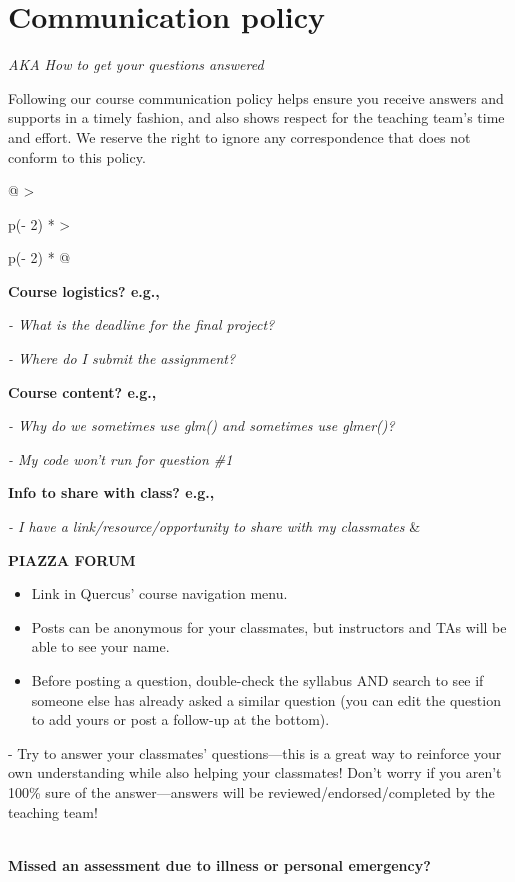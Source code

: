 \documentclass[
  openany]{book}
\begin{document}
\hypertarget{communication-policy}{%
\section{Communication policy}\label{communication-policy}}

\emph{AKA How to get your questions answered}

Following our course communication policy helps ensure you receive answers and supports in a timely fashion, and also shows respect for the teaching team's time and effort. We reserve the right to ignore any correspondence that does not conform to this policy.

\begin{longtable}[]{@{}
  >{\raggedright\arraybackslash}p{(\columnwidth - 2\tabcolsep) * }
  >{\raggedright\arraybackslash}p{(\columnwidth - 2\tabcolsep) * }@{}}
\toprule
\endhead
\textbf{Course logistics? e.g.,}

\emph{- What is the deadline for the final project?}

\emph{- Where do I submit the assignment?}

\textbf{Course content? e.g.,}

\emph{- Why do we sometimes use glm() and sometimes use glmer()?}

\emph{- My code won't run for question \#1}

\textbf{Info to share with class? e.g.,}

\emph{- I have a link/resource/opportunity to share with my classmates} & \begin{minipage}[t]{\linewidth}\raggedright
\textbf{PIAZZA FORUM}

\begin{itemize}
\item
  Link in Quercus' course navigation menu.
\item
  Posts can be anonymous for your classmates, but instructors and TAs will be able to see your name.
\item
  Before posting a question, double-check the syllabus AND search to see if someone else has already asked a similar question (you can edit the question to add yours or post a follow-up at the bottom).
\end{itemize}

- Try to answer your classmates' questions---this is a great way to reinforce your own understanding while also helping your classmates! Don't worry if you aren't 100\% sure of the answer---answers will be reviewed/endorsed/completed by the teaching team!
\end{minipage} \\
\textbf{Missed an assessment due to illness or personal emergency?}


\end{longtable}
\end{document}
